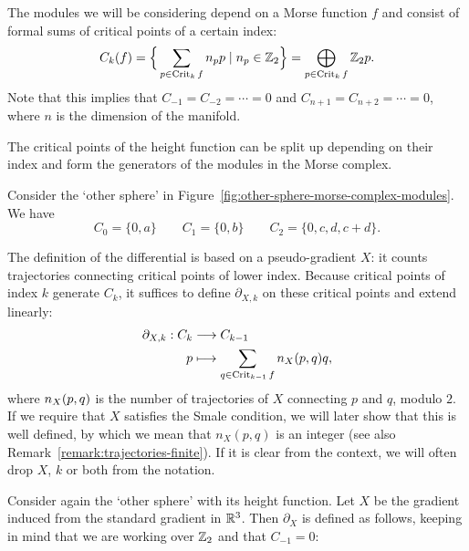 The modules we will be considering depend on a Morse function $f$ and consist of formal sums of critical points of a certain index:
\[
    C_k(f) = \Big\{ \sum_{p \in \operatorname{Crit}_k f} n_p p  \mid n_p \in \mathbb{Z}_2\Big\}  = \bigoplus_{p \in \operatorname{Crit}_k f} \mathbb{Z}_2 p
.\] 
Note that this implies that $C_{-1} = C_{-2} = \cdots = 0$ and $C_{n+1} = C_{n+2} = \cdots = 0$, where $n$ is the dimension of the manifold.


\begin{marginfigure}
    \centering
    \caption{The critical points of the height function can be split up depending on their index and form the generators of the modules in the Morse complex.}
    \label{fig:other-sphere-morse-complex-modules}
\end{marginfigure}

\begin{eg}
    Consider the `other sphere' in Figure~\ref{fig:other-sphere-morse-complex-modules}. We have
    \[
    C_0 = \{0, a\}  \qquad C_1 = \{0, b\}  \qquad C_2 = \{0, c, d, c+d\} 
    .\] 
\end{eg}

The definition of the differential is based on a pseudo-gradient $X$: it counts trajectories connecting critical points of lower index.
Because critical points of index $k$ generate $C_k$, it suffices to define $\partial_{X,k}$ on these critical points and extend linearly:
\begin{align*}
    \partial_{X, k}: C_k &\longrightarrow C_{k-1} \\
    p &\longmapsto \sum_{q \in \operatorname{Crit}_{k-1} f} n_{X}(p, q) q
,\end{align*}
where $n_{X}(p, q)$ is the number of trajectories of $X$ connecting $p$ and $q$, modulo $2$.
If we require that $X$ satisfies the Smale condition, we will later show that this is well defined, by which we mean that $n_X(p,q)$ is an integer (see also Remark~\ref{remark:trajectories-finite}).
If it is clear from the context, we will often drop $X$, $k$ or both from the notation.
\begin{eg}
    Consider again the `other sphere' with its height function.
    Let $X$ be the gradient induced from the standard gradient in $\mathbb{R}^3$.
    Then $\partial_X$ is defined as follows, keeping in mind that we are working over $\mathbb{Z}_2$ and that $C_{-1} = 0$:
\begin{figure}[H]
    \centering
\end{figure}
\end{eg}

